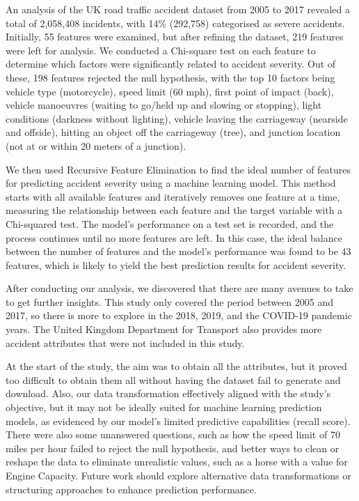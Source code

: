 An analysis of the UK road traffic accident dataset from 2005 to 2017 revealed a total of 2,058,408 incidents, with 14\% (292,758) categorised as severe accidents.
Initially, 55 features were examined, but after refining the dataset, 219 features were left for analysis.
We conducted a Chi-square test on each feature to determine which factors were significantly related to accident severity.
Out of these, 198 features rejected the null hypothesis, with the top 10 factors being vehicle type (motorcycle), speed limit (60 mph), first point of impact (back), vehicle manoeuvres (waiting to go/held up and slowing or stopping), light conditions (darkness without lighting), vehicle leaving the carriageway (nearside and offside), hitting an object off the carriageway (tree), and junction location (not at or within 20 meters of a junction).

We then used Recursive Feature Elimination to find the ideal number of features for predicting accident severity using a machine learning model.
This method starts with all available features and iteratively removes one feature at a time, measuring the relationship between each feature and the target variable with a Chi-squared test.
The model's performance on a test set is recorded, and the process continues until no more features are left.
In this case, the ideal balance between the number of features and the model's performance was found to be 43 features, which is likely to yield the best prediction results for accident severity.

After conducting our analysis, we discovered that there are many avenues to take to get further insights.
This study only covered the period between 2005 and 2017, so there is more to explore in the 2018, 2019, and the COVID-19 pandemic years.
The United Kingdom Department for Transport also provides more accident attributes that were not included in this study.

At the start of the study, the aim was to obtain all the attributes, but it proved too difficult to obtain them all without having the dataset fail to generate and download.
Also, our data transformation effectively aligned with the study's objective, but it may not be ideally suited for machine learning prediction models, as evidenced by our model's limited predictive capabilities (recall score).
There were also some unanswered questions, such as how the speed limit of 70 miles per hour failed to reject the null hypothesis, and better ways to clean or reshape the data to eliminate unrealistic values, such as a horse with a value for Engine Capacity.
Future work should explore alternative data transformations or structuring approaches to enhance prediction performance.

